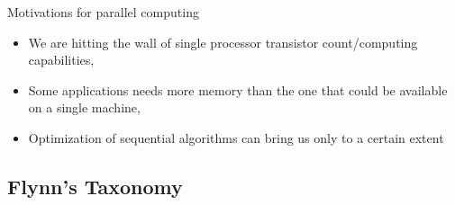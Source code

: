 \documentclass{beamer}
\begin{document}
\begin{frame}{Motivations for parallel computing}
\begin{itemize}
\item<1-> We are hitting the wall of single processor transistor count/computing capabilities,
\item<2-> Some applications needs more memory than the one that could be available on a single machine,
\item<3-> Optimization of sequential algorithms can bring us only to a certain extent
\end{itemize}


\end{frame}

\subsection{Flynn's Taxonomy}
\end{document}
